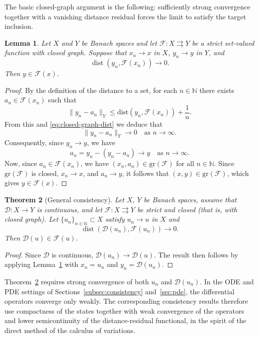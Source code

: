 \documentclass[11pt]{elsarticle}
\newtheorem{theorem}{Theorem}[section]
\newtheorem{lemma}[theorem]{Lemma}
\theoremstyle{definition}
\theoremstyle{remark}
\numberwithin{equation}{section}
\def\dist{\operatorname{dist}}
\begin{document}
	The basic closed-graph argument is the following: sufficiently strong
	convergence together with a vanishing distance residual forces the limit
	to satisfy the target inclusion.
	
	\begin{lemma}\label{lem:closed-graph}
		Let $X$ and $Y$ be Banach spaces and let $\mathcal{F}: X \rightrightarrows Y$ be a strict set-valued function with closed graph.
		Suppose that $x_n \to x$ in $X$, $y_n \to y$ in $Y$, and 
		\begin{equation} \label{eq:closed-graph-dist}
			\dist(y_n, \mathcal{F}(x_n)) \to 0.
		\end{equation}
		Then $y \in \mathcal{F}(x)$.
	\end{lemma}
	
	\begin{proof}
		By the definition of the distance to a set,
		for each $n \in \mathbb{N}$ there exists $a_n \in \mathcal{F}(x_n)$ such that
		$$
		\|y_n - a_n\|_Y \leq \text{dist}(y_n, \mathcal{F}(x_n)) + \frac{1}{n}.
		$$
		From this and \eqref{eq:closed-graph-dist} we deduce that
		\[
		\|y_n - a_n\|_Y \to 0 \quad \text{as } n \to \infty.
		\]
		Consequently, since $y_n \to y$, we have 
		\[
		a_n = y_n - (y_n - a_n) \to y \quad \text{as } n \to \infty.
		\]
		Now, since $a_n \in \mathcal{F}(x_n)$, we have $(x_n, a_n) \in \text{gr}(\mathcal{F})$ for all $n\in\mathbb{N}$.
		Since $\text{gr}(\mathcal{F})$ is closed, $x_n \to x$, and $a_n \to y$, it follows that $(x, y) \in \text{gr}(\mathcal{F})$, 
		which gives $y \in \mathcal{F}(x)$.
	\end{proof}
	
	\begin{theorem}[General consistency]\label{thm:general-consistency}
		Let $X$, $Y$ be Banach spaces, assume that $\mathcal{D}:X\to Y$ is continuous,
		and let $\mathcal{F}:X\rightrightarrows Y$ be strict and closed (that is, with closed graph).
		Let $\{u_n\}_{n\in\mathbb{N}}\subset X$ satisfy $u_n\to u$ in $X$ and
		\[
		\dist(\mathcal{D}(u_n),\mathcal{F}(u_n))\to 0.
		\]
		Then
		$\mathcal{D}(u)\in\mathcal{F}(u)$.
	\end{theorem}
	
	\begin{proof}
		Since $\mathcal{D}$ is continuous, $\mathcal{D}(u_n)\to\mathcal{D}(u)$. The result then follows by applying Lemma~\ref{lem:closed-graph} with $x_n=u_n$ and $y_n=\mathcal{D}(u_n)$.
	\end{proof}
	
	Theorem~\ref{thm:general-consistency} requires strong convergence of both
	$u_n$ and $\mathcal{D}(u_n)$. In the ODE and PDE settings of
	Sections~\ref{subsec:consistency} and~\ref{sec:pde}, the differential
	operators converge only weakly. The corresponding consistency results
	therefore use compactness of the states together with weak convergence of
	the operators and lower semicontinuity of the distance-residual functional,
	in the spirit of the direct method of the calculus of variations.
	
\end{document}
